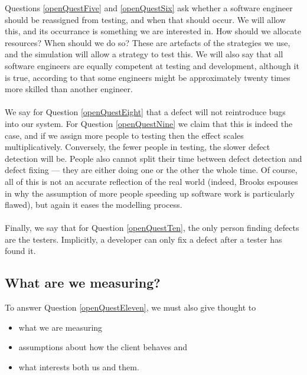 Questions \ref{openQuestFive} and \ref{openQuestSix} ask whether a software engineer should be reassigned from testing, and
when that should occur.
We will allow this, and its occurrance is something we are interested in.
How should we allocate resources?
When should we do so?
These are artefacts of the strategies we use, and the simulation will allow a strategy to test
this.
We will also say that all software engineers are equally competent at testing and development,
although it is true, according to \FIXME that some engineers might be approximately twenty times
more skilled than another engineer.\\
\\
We say for Question \ref{openQuestEight} that a defect will not reintroduce bugs into our system.
For Question \ref{openQuestNine} we claim that this is indeed the case, and if we assign more people
to testing then the effect scales multiplicatively.
Conversely, the fewer people in testing, the slower defect detection will be.
People also cannot split their time between defect detection and defect fixing --- they are either
doing one or the other the whole time.
Of course, all of this is not an accurate reflection of the real world (indeed, Brooks espouses in
\FIXME why the assumption of more people speeding up software work is particularly flawed), but again
it eases the modelling process.\\
\\
Finally, we say that for Question \ref{openQuestTen}, the only person finding defects are the
testers.
Implicitly, a developer can only fix a defect after a tester has found it.\\

\subsection{What are we measuring?}

To answer Question \ref{openQuestEleven}, we must also give thought to 
\begin{itemize}
	\item what we are measuring
	\item assumptions about how the client behaves and
	\item what interests both us and them.
\end{itemize}

